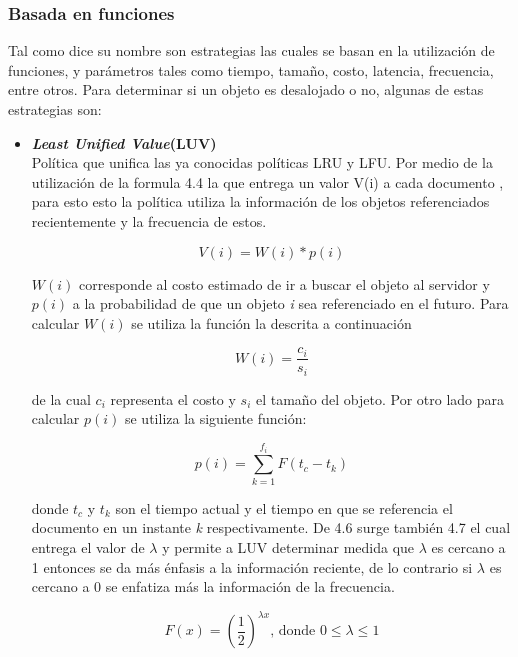 \documentclass[12pt]{ociamthesis}  %
\begin{document}
\subsubsection{Basada en funciones}
Tal como dice su nombre son estrategias las cuales se basan en la utilización de funciones, y parámetros tales como tiempo, tamaño, costo, latencia, frecuencia, entre otros. Para determinar si un objeto es desalojado o no, algunas de estas estrategias son:
\begin{itemize}
	\item \textbf{\textit{Least Unified Value}(LUV)}\\
	Política que unifica las ya conocidas políticas LRU y LFU. Por medio de la utilización de la formula 4.4 la que entrega un valor V(i) a cada documento , para esto esto la política utiliza la información de los objetos referenciados recientemente y la frecuencia de estos.
	
	\begin{equation}
	V(i) = W(i) * p(i)
	\end{equation}
	
	$W(i)$ corresponde al costo estimado de ir a buscar el objeto al servidor y $p(i)$ a la probabilidad de que un objeto \textit{i} sea referenciado en el futuro. Para calcular $W(i)$ se utiliza la función la descrita a continuación
	
	 \begin{equation}
	 W(i) = \frac{c_i}{s_i}
	 \end{equation}
	
	de la cual $c_i$ representa el costo y $s_i$ el tamaño del objeto. Por otro lado para calcular $p(i)$ se utiliza la siguiente función:
	
	\begin{equation}
		 p(i) = \displaystyle\sum_{k=1}^{f_i} F(t_c - t_k) 
	\end{equation}
	
	donde $t_c$ y $t_k$ son el tiempo actual y el tiempo en que se referencia el documento en un instante \textit{k} respectivamente. De 4.6 surge también 4.7 el cual entrega el valor de $\lambda$ y permite a LUV determinar medida que $\lambda$ es cercano a 1 entonces se da más énfasis a la información reciente, de lo contrario si $\lambda$ es cercano a 0 se enfatiza más la información de la frecuencia.
	
		\begin{equation}
		F(x) = \left(\frac{1}{2}\right)^{\lambda x}\textrm{, donde $0 \leq \lambda \leq 1$}
		\end{equation}
	

\end{itemize}
\end{document}
